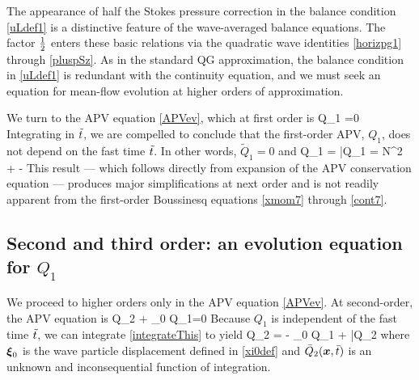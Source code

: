 \documentclass[12pt, oneside]{book}
\begin{document}
The appearance of half the Stokes pressure correction in the balance condition \eqref{uLdef1} is a distinctive feature of the wave-averaged balance equations. The  factor $\half$ enters these basic relations via the quadratic wave identities \eqref{horizpg1} through \eqref{pluspSz}. 
As in the standard QG approximation, the balance condition in \eqref{uLdef1} is redundant with the continuity equation, and we must seek an equation for mean-flow evolution at higher orders of approximation.

We turn to the APV equation \eqref{APVev}, which at first order is
\beq
Q_{1 \tt} =0 \per
\label{tooSimp}
\eeq
Integrating in $\tt$, we are compelled to conclude that the first-order APV, $Q_1$, does not depend on the fast time $\tt$.  In other words, $\tilde Q_1=0$ and 
\beq
Q_1 = \bar Q_1 =  N^2  +  -   \per
\label{Qone1}
\eeq
This result --- which follows directly from expansion of the APV conservation equation --- produces major simplifications at next order and is not readily apparent from the first-order Boussinesq equations  \eqref{xmom7} through \eqref{cont7}.

\subsection{Second and third order: an evolution equation for $Q_1$}
\label{o2}

We proceed to higher orders only in the APV equation \eqref{APVev}. At  second-order, the APV equation is
\beq
Q_{2 \tt} +  \bu_0 \bcdot \bnabla  Q_1=0 \per
\label{integrateThis}
\eeq
Because $Q_1$ is independent of the fast time $\tt$, we can integrate  \eqref{integrateThis}  to yield
\beq
Q_2 = -  \bxi_0 \bcdot \bnabla  Q_1 + \bar  Q_2 \com
\label{Q2}
\eeq
where $\bxi_0$ is the wave particle displacement defined in \eqref{xi0def} and $\bar Q_2 (\bx,\bar t)$ is an unknown and inconsequential  function of integration. 
\end{document}
